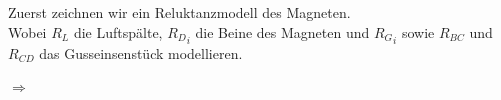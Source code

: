\newpage
{}
\beginbsp
Zuerst zeichnen wir ein Reluktanzmodell des Magneten. \\
Wobei $R_L$ die Luftspälte, ${R_D}_i$ die Beine des Magneten und ${R_G}_i$ sowie $R_{BC}$ und $R_{CD}$ das Gusseinsenstück modellieren.


\begin{minipage}[t]{0.55\textwidth}
\end{minipage}
\begin{minipage}[t]{0.05\textwidth}
	\begin{center}
		\vspace{-3cm}
		$\Rightarrow$ \\

		\fspace
		\fspace
	\end{center}
\end{minipage}
\begin{minipage}[t]{0.29\textwidth}
\end{minipage}



